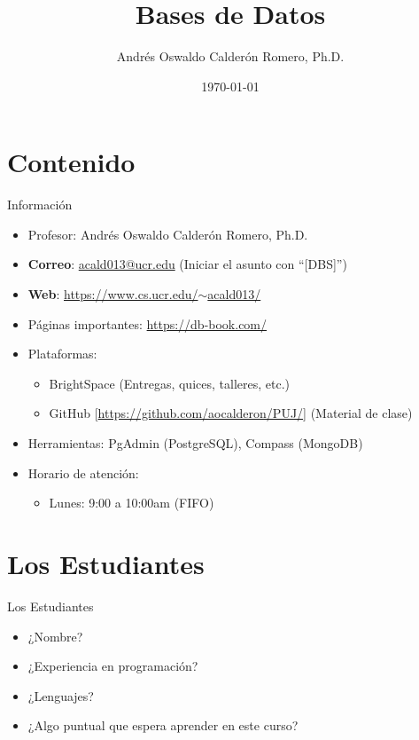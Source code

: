 \documentclass{beamer}
\title{Bases de Datos}
\author{Andrés Oswaldo Calderón Romero, Ph.D.}
\date{\today}
\begin{document}
\frame{\titlepage}

\section{Contenido}

\begin{frame}{Información}
\begin{itemize}
    \item Profesor: Andrés Oswaldo Calderón Romero, Ph.D.
    \item \textbf{Correo}: \href{mailto:acald013@ucr.edu}{acald013@ucr.edu} (Iniciar el asunto con ``[DBS]'')\\
    \item \textbf{Web}: \href{https://www.cs.ucr.edu/~acald013/}{https://www.cs.ucr.edu/$\sim$acald013/} \\
    \item Páginas importantes: \url{https://db-book.com/}
    \item Plataformas: 
    \begin{itemize}
        \item BrightSpace (Entregas, quices, talleres, etc.)
        \item GitHub [\url{https://github.com/aocalderon/PUJ/}] (Material de clase)
    \end{itemize}
    \item Herramientas: PgAdmin (PostgreSQL), Compass (MongoDB)
    \item Horario de atención: 
    \begin{itemize}
        \item Lunes: 9:00 a 10:00am (FIFO)
    \end{itemize}
\end{itemize}
\end{frame}

\section{Los Estudiantes}

\begin{frame}{Los Estudiantes}
\begin{itemize}
    \item ¿Nombre? 
    \item ¿Experiencia en programación? 
    \item ¿Lenguajes? 
    \item ¿Algo puntual que espera aprender en este curso?
\end{itemize}
\end{frame}
\end{document}
